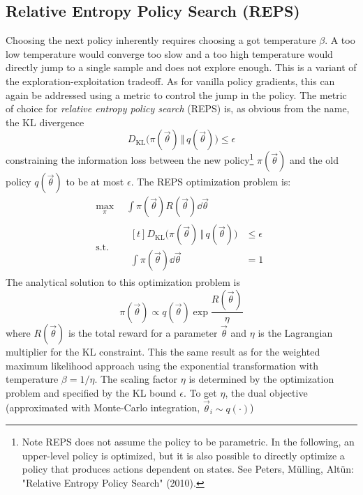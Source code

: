 		\subsection{Relative Entropy Policy Search (REPS)}
			Choosing the next policy inherently requires choosing a got temperature \(\beta\). A too low temperature would converge too slow and a too high temperature would directly jump to a single sample and does not explore enough. This is a variant of the exploration-exploitation tradeoff. As for vanilla policy gradients, this can again be addressed using a metric to control the jump in the policy. The metric of choice for \emph{relative entropy policy search} (REPS) is, as obvious from the name, the KL divergence
			\begin{equation*}
				D_\mathrm{KL}\big( \pi(\vec{\theta}) \,\Vert\, q(\vec{\theta}) \big) \leq \epsilon
			\end{equation*}
			constraining the information loss between the new policy\footnote{Note REPS does not assume the policy to be parametric. In the following, an upper-level policy is optimized, but it is also possible to directly optimize a policy that produces actions dependent on states. See Peters, Mülling, Altün: "Relative Entropy Policy Search" (2010).} \(\pi(\vec{\theta})\) and the old policy \(q(\vec{\theta})\) to be at most \(\epsilon\). The REPS optimization problem is:
			\begin{equation}
				\begin{aligned}
					\max_\pi \,         & \int\! \pi(\vec{\theta}) R(\vec{\theta}) \dd{\vec{\theta}} \\
					\mathrm{s.t.} \quad &
					\begin{aligned}[t]
						D_\mathrm{KL}\big( \pi(\vec{\theta}) \,\Vert\, q(\vec{\theta}) \big) & \leq \epsilon \\
						\int\! \pi(\vec{\theta}) \dd{\vec{\theta}}                           & = 1
					\end{aligned}
				\end{aligned}
			\end{equation}
			The analytical solution to this optimization problem is
			\begin{equation*}
				\pi(\vec{\theta}) \propto q(\vec{\theta}) \exp{ \frac{R(\vec{\theta})}{\eta} }
			\end{equation*}
			where \( R(\vec{\theta}) \) is the total reward for a parameter \( \vec{\theta} \) and \(\eta\) is the Lagrangian multiplier for the KL constraint. This the same result as for the weighted maximum likelihood approach using the exponential transformation with temperature \( \beta = 1/\eta \). The scaling factor \(\eta\) is determined by the optimization problem and specified by the KL bound \(\epsilon\). To get \(\eta\), the dual objective (approximated with Monte-Carlo integration, \( \vec{\theta}_i \sim q(\cdot) \))
